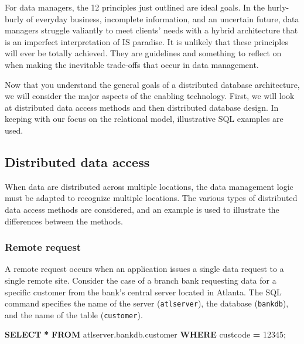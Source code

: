 \documentclass[
]{article}
\newenvironment{Shaded}{\begin{snugshade}}{\end{snugshade}}
\newcommand{\DecValTok}[1]{\textcolor[rgb]{0.00,0.00,0.81}{#1}}
\newcommand{\KeywordTok}[1]{\textcolor[rgb]{0.13,0.29,0.53}{\textbf{#1}}}
\newcommand{\NormalTok}[1]{#1}
\newcommand{\OperatorTok}[1]{\textcolor[rgb]{0.81,0.36,0.00}{\textbf{#1}}}
\begin{document}
For data managers, the 12 principles just outlined are ideal goals. In
the hurly-burly of everyday business, incomplete information, and an
uncertain future, data managers struggle valiantly to meet clients'
needs with a hybrid architecture that is an imperfect interpretation of
IS paradise. It is unlikely that these principles will ever be totally
achieved. They are guidelines and something to reflect on when making
the inevitable trade-offs that occur in data management.

Now that you understand the general goals of a distributed database
architecture, we will consider the major aspects of the enabling
technology. First, we will look at distributed data access methods and
then distributed database design. In keeping with our focus on the
relational model, illustrative SQL examples are used.

\hypertarget{distributed-data-access}{%
\subsection*{Distributed data access}\label{distributed-data-access}}

When data are distributed across multiple locations, the data management
logic must be adapted to recognize multiple locations. The various types
of distributed data access methods are considered, and an example is
used to illustrate the differences between the methods.

\hypertarget{remote-request}{%
\subsubsection*{Remote request}\label{remote-request}}

A remote request occurs when an application issues a single data request
to a single remote site. Consider the case of a branch bank requesting
data for a specific customer from the bank's central server located in
Atlanta. The SQL command specifies the name of the server (\texttt{atlserver}),
the database (\texttt{bankdb}), and the name of the table (\texttt{customer}).

\begin{Shaded}
\begin{Highlighting}[]
\KeywordTok{SELECT} \OperatorTok{*} \KeywordTok{FROM}\NormalTok{ atlserver.bankdb.customer}
    \KeywordTok{WHERE}\NormalTok{ custcode }\OperatorTok{=} \DecValTok{12345}\NormalTok{;}
\end{Highlighting}
\end{Shaded}
\end{document}
